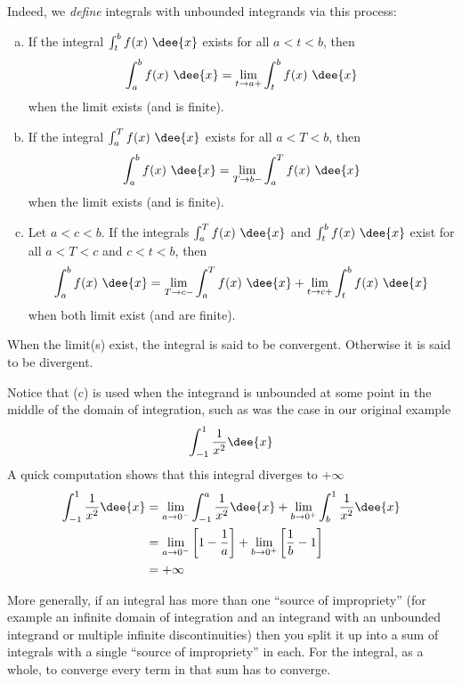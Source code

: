 Indeed, we \emph{define} integrals with unbounded integrands via this process:
\begin{defn}\label{def:IItype2}
\begin{enumerate}[(a)]
\item  If the integral $\int_t^b f(x)\ \dee{x}$ exists for all $a<t<b$, then
\begin{equation*}
\int_a^b f(x)\ \dee{x}=\lim_{t\rightarrow a+}\int_t^b f(x)\ \dee{x}
\end{equation*}
when the limit exists (and is finite).
\item  If the integral $\int_a^T f(x)\ \dee{x}$ exists for all $a<T<b$, then
\begin{equation*}
\int_a^b f(x)\ \dee{x}=\lim_{T\rightarrow b-}\int_a^T f(x)\ \dee{x}
\end{equation*}
when the limit exists (and is finite).
\item  Let $a<c<b$. If the integrals $\int_a^T f(x)\ \dee{x}$ and
$\int_t^b f(x)\ \dee{x}$ exist for all $a<T<c$ and $c<t<b$, then
\begin{equation*}
\int_a^b f(x)\ \dee{x}=\lim_{T\rightarrow c-}\int_a^T f(x)\ \dee{x}
+\lim_{t\rightarrow c+}\int_t^b f(x)\ \dee{x}
\end{equation*}
when both limit exist (and are finite).
\end{enumerate}
When the limit(s) exist, the integral is said to be convergent. Otherwise
it is said to be divergent.
\end{defn}
Notice that (c) is used when the integrand is unbounded at some point in the middle of
the domain of integration, such as was the case in our original example
\begin{align*}
  \int_{-1}^1 \frac{1}{x^2} \dee{x}
\end{align*}
A quick computation shows that this integral diverges to $+\infty$
\begin{align*}
  \int_{-1}^1 \frac{1}{x^2} \dee{x}
  &= \lim_{a \to 0^-} \int_{-1}^a \frac{1}{x^2} \dee{x}
  + \lim_{b \to 0^+} \int_b^1 \frac{1}{x^2}\dee{x} \\
  &= \lim_{a \to 0^-} \left[1-\frac{1}{a} \right]
+ \lim_{b \to 0^+} \left[\frac{1}{b}-1 \right]\\
  &= + \infty
\end{align*}

More generally, if an integral has more than one ``source of impropriety'' (for example
an infinite domain of integration and an integrand with an unbounded integrand or multiple
infinite discontinuities) then you split it up into a sum of integrals with a single
``source of impropriety'' in each. For the integral, as a whole, to converge every term in
that sum has to converge.

